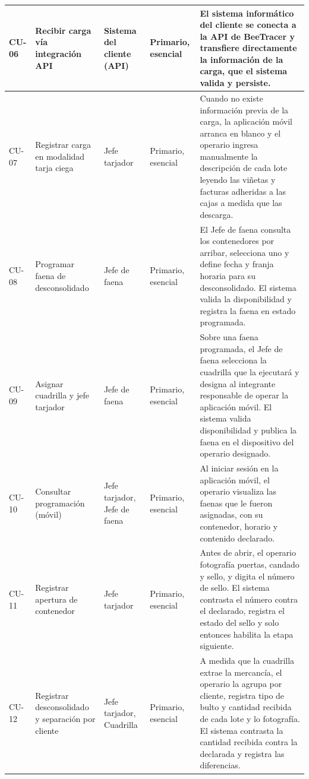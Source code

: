 {\begin{longtable}{L{0.06\textwidth} L{0.18\textwidth} L{0.14\textwidth} L{0.11\textwidth} L{0.41\textwidth}}
CU-06 & Recibir carga vía integración API & Sistema del cliente (API) & Primario, esencial &
El sistema informático del cliente se conecta a la API de BeeTracer y transfiere directamente la
información de la carga, que el sistema valida y persiste. \\
\midrule

CU-07 & Registrar carga en modalidad tarja ciega & Jefe tarjador & Primario, esencial &
Cuando no existe información previa de la carga, la aplicación móvil arranca en blanco y el
operario ingresa manualmente la descripción de cada lote leyendo las viñetas y facturas adheridas a
las cajas a medida que las descarga. \\
\midrule

CU-08 & Programar faena de desconsolidado & Jefe de faena & Primario, esencial &
El Jefe de faena consulta los contenedores por arribar, selecciona uno y define fecha y franja
horaria para su desconsolidado. El sistema valida la disponibilidad y registra la faena en estado
programada. \\
\midrule

CU-09 & Asignar cuadrilla y jefe tarjador & Jefe de faena & Primario, esencial &
Sobre una faena programada, el Jefe de faena selecciona la cuadrilla que la ejecutará y designa al
integrante responsable de operar la aplicación móvil. El sistema valida disponibilidad y publica la
faena en el dispositivo del operario designado. \\
\midrule

CU-10 & Consultar programación (móvil) & Jefe tarjador, Jefe de faena & Primario, esencial &
Al iniciar sesión en la aplicación móvil, el operario visualiza las faenas que le fueron asignadas,
con su contenedor, horario y contenido declarado. \\
\midrule

CU-11 & Registrar apertura de contenedor & Jefe tarjador & Primario, esencial &
Antes de abrir, el operario fotografía puertas, candado y sello, y digita el número de sello. El
sistema contrasta el número contra el declarado, registra el estado del sello y solo entonces
habilita la etapa siguiente. \\
\midrule

CU-12 & Registrar desconsolidado y separación por cliente & Jefe tarjador, Cuadrilla &
Primario, esencial &
A medida que la cuadrilla extrae la mercancía, el operario la agrupa por cliente, registra tipo de
bulto y cantidad recibida de cada lote y lo fotografía. El sistema contrasta la cantidad recibida
contra la declarada y registra las diferencias. \\
\midrule


\end{longtable}}
